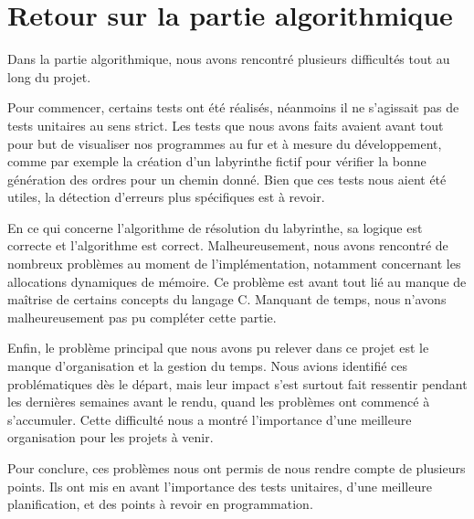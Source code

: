 \documentclass[a4paper, 11pt]{article}
\begin{document}
\onehalfspacing

\section*{Retour sur la partie algorithmique}

Dans la partie algorithmique, nous avons rencontré plusieurs difficultés tout au long du projet.

Pour commencer, certains tests ont été réalisés, néanmoins il ne s’agissait pas de tests unitaires au sens strict. Les tests que nous avons faits avaient avant tout pour but de visualiser nos programmes au fur et à mesure du développement, comme par exemple la création d’un labyrinthe fictif pour vérifier la bonne génération des ordres pour un chemin donné. Bien que ces tests nous aient été utiles, la détection d’erreurs plus spécifiques est à revoir.

En ce qui concerne l’algorithme de résolution du labyrinthe, sa logique est correcte et l’algorithme est correct. Malheureusement, nous avons rencontré de nombreux problèmes au moment de l’implémentation, notamment concernant les allocations dynamiques de mémoire. Ce problème est avant tout lié au manque de maîtrise de certains concepts du langage C. Manquant de temps, nous n’avons malheureusement pas pu compléter cette partie.

Enfin, le problème principal que nous avons pu relever dans ce projet est le manque d’organisation et la gestion du temps. Nous avions identifié ces problématiques dès le départ, mais leur impact s’est surtout fait ressentir pendant les dernières semaines avant le rendu, quand les problèmes ont commencé à s’accumuler. Cette difficulté nous a montré l’importance d’une meilleure organisation pour les projets à venir.

Pour conclure, ces problèmes nous ont permis de nous rendre compte de plusieurs points. Ils ont mis en avant l’importance des tests unitaires, d’une meilleure planification, et des points à revoir en programmation.
\end{document}
